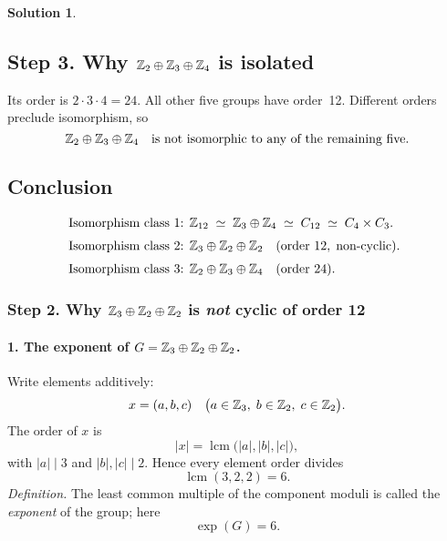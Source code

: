 \documentclass[12pt]{article}
\theoremstyle{definition} %
\newtheorem{solution}{Solution}
\theoremstyle{plain} %
\begin{document}
\begin{solution}
  \subsection*{Step 3.  Why \(\Bbb Z_2\oplus\Bbb Z_3\oplus\Bbb Z_4\) is isolated}
  
  Its order is \(2\cdot3\cdot4 = 24\).  
  All other five groups have order~12.
  Different orders preclude isomorphism, so
  \[
     \Bbb Z_2\oplus\Bbb Z_3\oplus\Bbb Z_4
     \quad\text{is not isomorphic to any of the remaining five.}
  \]
  
  \subsection*{Conclusion}
  
  \[
  \begin{array}{@{}l}
  \text{Isomorphism class 1: }
  \Bbb Z_{12}\;\simeq\;
  \Bbb Z_3\oplus\Bbb Z_4\;\simeq\;
  C_{12}\;\simeq\;
  C_4\times C_3.\\[6pt]
  \text{Isomorphism class 2: }
  \Bbb Z_3\oplus\Bbb Z_2\oplus\Bbb Z_2
  \quad(\text{order }12,\;\text{non‑cyclic}).\\[6pt]
  \text{Isomorphism class 3: }
  \Bbb Z_2\oplus\Bbb Z_3\oplus\Bbb Z_4
  \quad(\text{order }24).
  \end{array}
  \]
  \end{solution}
\subsubsection*{Step 2.\;  Why \( \Bbb Z_3\oplus\Bbb Z_2\oplus\Bbb Z_2 \) is \emph{not} cyclic of order 12}

\paragraph{1.\;  The exponent of \(G=\Bbb Z_3\oplus\Bbb Z_2\oplus\Bbb Z_2\).}
Write elements additively:
\[
  x=(a,b,c)\quad 
  \bigl(a\in\Bbb Z_3,\; b\in\Bbb Z_2,\; c\in\Bbb Z_2\bigr).
\]
The order of \(x\) is
\[
  \lvert x\rvert=\operatorname{lcm}\bigl(\lvert a\rvert,\lvert b\rvert,\lvert c\rvert\bigr),
\]
with \(\lvert a\rvert\mid 3\) and \(\lvert b\rvert,\lvert c\rvert\mid 2\).
Hence every element order divides
\[
  \operatorname{lcm}(3,2,2)=6.
\]
\emph{Definition.}  
The least common multiple of the component moduli is called the
\emph{exponent} of the group; here  
\[
  \exp(G)=6.
\]
\end{document}

